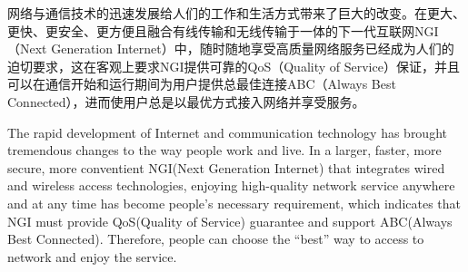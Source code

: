 
\begin{cabstract}

网络与通信技术的迅速发展给人们的工作和生活方式带来了巨大的改变。在更大、更快、更安全、更方便且融合有线传输和无线传输于一体的下一代互联网NGI（Next Generation Internet）中，随时随地享受高质量网络服务已经成为人们的迫切要求，这在客观上要求NGI提供可靠的QoS（Quality of Service）保证，并且可以在通信开始和运行期间为用户提供总最佳连接ABC（Always Best Connected），进而使用户总是以最优方式接入网络并享受服务。

\end{cabstract}


\begin{eabstract}

The rapid development of Internet and communication technology has brought tremendous changes to the way people work and live. In a larger, faster, more secure, more conventient NGI(Next Generation Internet) that integrates wired and wireless access technologies, enjoying high-quality network service anywhere and at any time has become people’s necessary requirement, which indicates that NGI must provide QoS(Quality of Service) guarantee and support ABC(Always Best Connected). Therefore, people can choose the “best” way to access to network and enjoy the service.

\end{eabstract}

